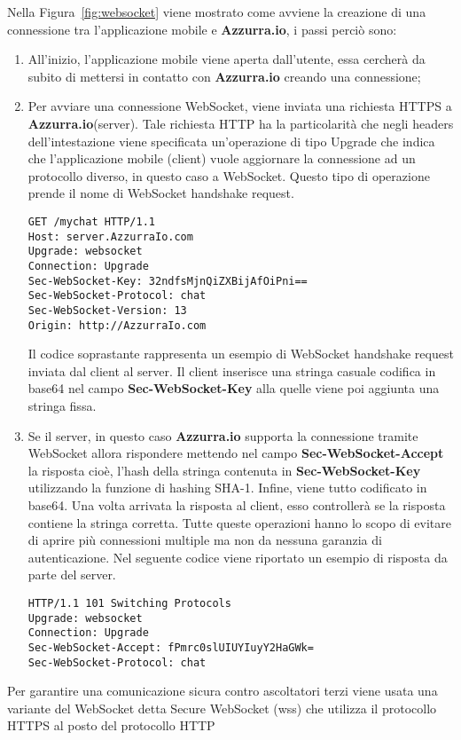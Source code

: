 Nella Figura~\ref{fig:websocket} viene mostrato come avviene la creazione di una connessione tra l'applicazione mobile e \textbf{Azzurra.io}, i passi perciò sono:
\begin{enumerate}
	\item All'inizio, l'applicazione mobile viene aperta dall'utente, essa cercherà da subito di mettersi in contatto con \textbf{Azzurra.io} creando una connessione;
	\item Per avviare una connessione WebSocket, viene inviata una richiesta HTTPS a \textbf{Azzurra.io}(server). Tale richiesta HTTP ha la particolarità che negli headers dell’intestazione viene specificata un'operazione di tipo Upgrade che indica che l'applicazione mobile (client) vuole aggiornare la connessione ad un protocollo diverso, in questo caso a WebSocket. Questo tipo di operazione prende il nome di WebSocket handshake request.
	\begin{lstlisting}
GET /mychat HTTP/1.1
Host: server.AzzurraIo.com
Upgrade: websocket	
Connection: Upgrade		
Sec-WebSocket-Key: 32ndfsMjnQiZXBijAfOiPni==
Sec-WebSocket-Protocol: chat		
Sec-WebSocket-Version: 13		
Origin: http://AzzurraIo.com
	\end{lstlisting}
	Il codice soprastante rappresenta un esempio di WebSocket handshake request inviata dal client al server. Il client inserisce una stringa casuale codifica in base64 nel campo \textbf{Sec-WebSocket-Key} alla quelle viene poi aggiunta una stringa fissa.
	\item Se il server, in questo caso \textbf{Azzurra.io} supporta la connessione tramite WebSocket allora rispondere mettendo nel campo \textbf{Sec-WebSocket-Accept} la risposta cioè, l'hash della stringa contenuta in \textbf{Sec-WebSocket-Key} utilizzando la funzione di hashing SHA-1. Infine, viene tutto codificato in base64. Una volta arrivata la risposta al client, esso controllerà se la risposta contiene la stringa corretta. Tutte queste operazioni hanno lo scopo di evitare di aprire più connessioni multiple ma non da nessuna garanzia di autenticazione.
	Nel seguente codice viene riportato un esempio di risposta da parte del server.
	\begin{lstlisting}
HTTP/1.1 101 Switching Protocols
Upgrade: websocket
Connection: Upgrade
Sec-WebSocket-Accept: fPmrc0slUIUYIuyY2HaGWk=
Sec-WebSocket-Protocol: chat
	\end{lstlisting}
\end{enumerate}
Per garantire una comunicazione sicura contro ascoltatori terzi viene usata una variante del WebSocket detta Secure WebSocket (wss) che utilizza il protocollo HTTPS al posto del protocollo HTTP

